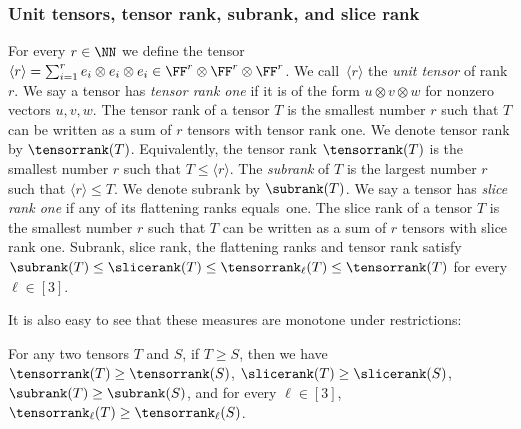 %
%
%
%
%
%
%
%

\subsubsection*{Unit tensors, tensor rank, subrank, and slice rank}
For every $r \in \NN$ we define the tensor $\langle r \rangle = \sum_{i=1}^r e_i \otimes e_i \otimes e_i \in \FF^r \otimes \FF^r \otimes \FF^r$. We call~$\langle r \rangle$ the \emph{unit tensor} of rank $r$.
We say a tensor has \emph{tensor rank one} if it is of the form $u \otimes v \otimes w$ for nonzero vectors $u,v,w$.
The tensor rank of a tensor $T$ is the smallest number $r$ such that $T$ can be written as a sum of $r$ tensors with tensor rank one. 
%
We denote tensor rank by $\tensorrank(T)$. Equivalently, the tensor rank $\tensorrank(T)$ is the smallest number $r$ such that $T \leq \langle r\rangle$. The \emph{subrank} of $T$ is the largest number $r$ such that $\langle r\rangle \leq T$. We denote subrank by $\subrank(T)$. 
We say a tensor has \emph{slice rank one} if any of its flattening ranks equals~one. The slice rank of a tensor $T$ is the smallest number $r$ such that $T$ can be written as a sum of $r$ tensors with slice rank one.
%
Subrank, slice rank, the flattening ranks and tensor rank satisfy $\subrank(T) \leq \slicerank(T) \leq \tensorrank_\ell(T) \leq \tensorrank(T)$ for every $\ell\in [3]$.

It is also easy to see that these measures are monotone under restrictions:

\begin{lemma}\label{lem:monotone-restrict}
    For any two tensors $T$ and $S$, if $T\geq S$, then we have $\tensorrank(T)\geq \tensorrank(S)$, $\slicerank(T)\geq \slicerank(S)$, $\subrank(T)\geq \subrank(S)$, and for every $\ell\in[3]$, %
    $\tensorrank_\ell(T)\geq \tensorrank_\ell(S)$.
\end{lemma}


